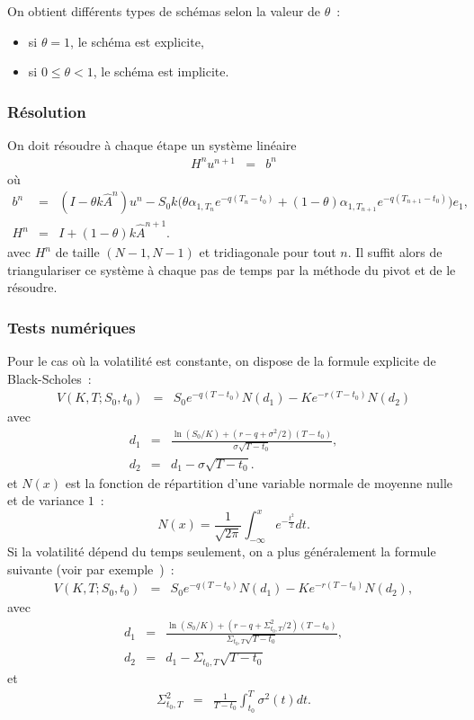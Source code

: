On obtient diff\'erents types de sch\'emas selon la valeur de 
$\theta$~: 
\begin{itemize}
\item si $\theta=1$, le sch\'ema est explicite,
\item si $0\leq \theta<1$, le sch\'ema est implicite.
\end{itemize}

\subsubsection{R\'esolution}

On doit r\'esoudre \`a chaque \'etape un syst\`eme lin\'eaire 
\begin{eqnarray*}
H^n u^{n+1} &=& b^n
\end{eqnarray*}
o\`u 
\begin{eqnarray*}
b^n &=& (I-\theta k \hat{A}^n)u^n - S_0k
\biggl(\theta \alpha_{1,T_n}e^{-q(T_n-t_0)}+(1-\theta)
\alpha_{1,T_{n+1}}e^{-q(T_{n+1}-t_0)}\biggr)e_1,\\
H^n &=& I+(1-\theta)k\hat{A}^{n+1}.
\end{eqnarray*}
avec $H^n$ de taille $(N-1,N-1)$ et tridiagonale pour tout $n$. Il 
suffit alors de triangulariser ce syst\`eme \`a chaque pas de temps 
par la m\'ethode du pivot et de le r\'esoudre.

\subsubsection{Tests num\'eriques}

Pour le cas o\`u la volatilit\'e est constante, on dispose de la 
formule explicite de Black-Scholes~:
\begin{eqnarray*}
V(K,T;S_0,t_0) &=& S_0e^{-q(T-t_0)}N(d_1) - Ke^{-r(T-t_0)}N(d_2)
\end{eqnarray*}
avec 
\begin{eqnarray*}
d_1 &=& \frac{\ln(S_0/K)+(r-q+\sigma^2/2)(T-t_0)}
{\sigma \sqrt{T-t_0}},\\
d_2 &=& d_1 - \sigma \sqrt{T-t_0}.
\end{eqnarray*}
et $N(x)$ est la fonction de r\'epartition d'une variable normale de 
moyenne nulle et de variance $1$~:
$$
N(x) = \frac{1}{\sqrt{2\pi}} \int_{-\infty}^x e^{-\frac{t^2}{2}} dt.
$$
Si la volatilit\'e d\'epend du temps seulement, on a plus 
g\'en\'eralement la formule suivante (voir par 
exemple~\cite{lamb:ell:91})~: 
\begin{eqnarray*}
V(K,T;S_0,t_0) &=& S_0e^{-q(T-t_0)}N(d_1) - 
Ke^{-r(T-t_0)}N(d_2), \label{tests}
\end{eqnarray*}
avec
\begin{eqnarray*}
d_1 &=& \frac{\ln(S_0/K)+(r-q+\Sigma_{t_0,T}^2/2)(T-t_0)}
{\Sigma_{t_0,T} \sqrt{T-t_0}},\\
d_2 &=& d_1 - \Sigma_{t_0,T} \sqrt{T-t_0} 
\end{eqnarray*}
et 
\begin{eqnarray*}
\Sigma_{t_0,T}^2 &=& \frac{1}{T-t_0}\int_{t_0}^T \sigma^2(t)dt.
\end{eqnarray*}

